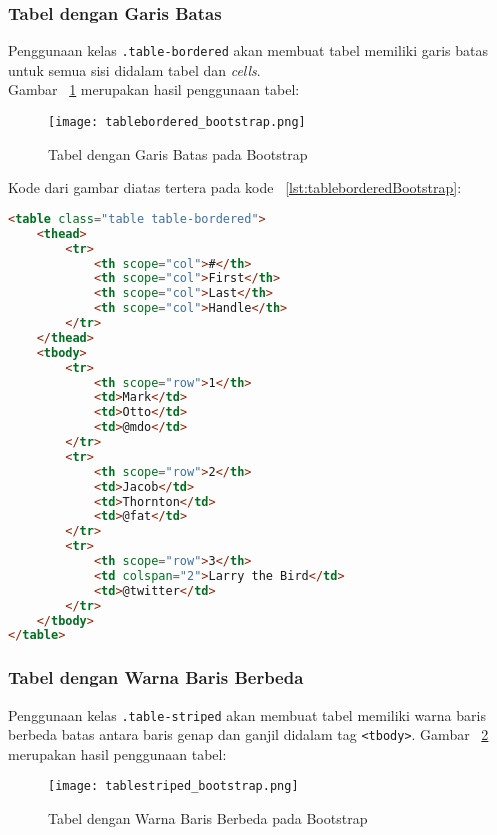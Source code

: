 \subsubsection{Tabel dengan Garis Batas}
Penggunaan kelas \texttt{.table-bordered} akan membuat tabel memiliki garis batas untuk semua sisi didalam tabel dan \textit{cells}.\\
Gambar ~\ref{fig:tableBorderedBootstrap} merupakan hasil penggunaan tabel:
\begin{figure} [H]
	\centering  
	\texttt{[image: tablebordered\_bootstrap.png]}  
	\caption{Tabel dengan Garis Batas pada Bootstrap} 
	\label{fig:tableBorderedBootstrap}
\end{figure}

\noindent Kode dari gambar diatas tertera pada kode ~\ref{lst:tableborderedBootstrap}:
\begin{lstlisting}[style=customhtml, language=HTML,  basicstyle=\ttfamily, frame=single, columns=fullflexible, keepspaces=true, breaklines=true, showstringspaces=false, label={lst:tableborderedBootstrap}, caption=Kode tabel dengan garis batas pada bootstrap 4] 
<table class="table table-bordered">
	<thead>
		<tr>
			<th scope="col">#</th>
			<th scope="col">First</th>
			<th scope="col">Last</th>
			<th scope="col">Handle</th>
		</tr>
	</thead>
	<tbody>
		<tr>
			<th scope="row">1</th>
			<td>Mark</td>
			<td>Otto</td>
			<td>@mdo</td>
		</tr>
		<tr>
			<th scope="row">2</th>
			<td>Jacob</td>
			<td>Thornton</td>
			<td>@fat</td>
		</tr>
		<tr>
			<th scope="row">3</th>
			<td colspan="2">Larry the Bird</td>
			<td>@twitter</td>
		</tr>
	</tbody>
</table>
\end{lstlisting}

\subsubsection{Tabel dengan Warna Baris Berbeda}
Penggunaan kelas \texttt{.table-striped} akan membuat tabel memiliki warna baris berbeda batas antara baris genap dan ganjil didalam tag \texttt{<tbody>}.
Gambar ~\ref{fig:tableStripedBootstrap} merupakan hasil penggunaan tabel:
\begin{figure} [H]
	\centering  
	\texttt{[image: tablestriped\_bootstrap.png]}  
	\caption{Tabel dengan Warna Baris Berbeda pada Bootstrap} 
	\label{fig:tableStripedBootstrap}
\end{figure}

